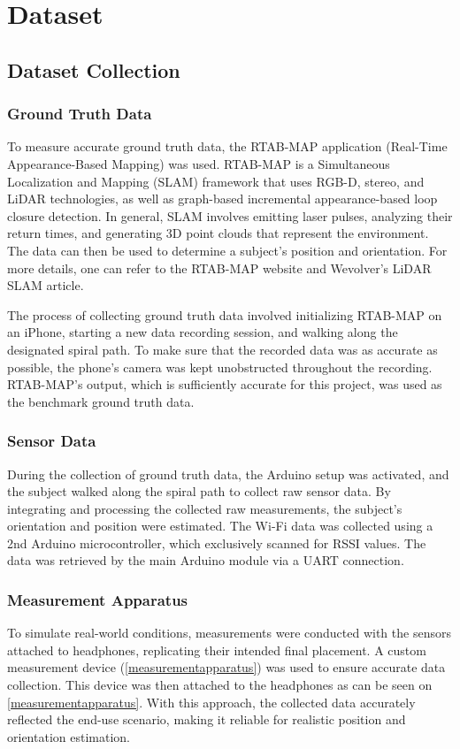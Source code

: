 \chapter{Dataset}
\label{appendix:dataset}
\section{Dataset Collection}

\subsection{Ground Truth Data}
To measure accurate ground truth data, the RTAB-MAP application (Real-Time Appearance-Based Mapping) was used. RTAB-MAP is a Simultaneous Localization and Mapping (SLAM) framework that uses RGB-D, stereo, and LiDAR technologies, as well as graph-based incremental appearance-based loop closure detection. In general, SLAM involves emitting laser pulses, analyzing their return times, and generating 3D point clouds that represent the environment. The data can then be used to determine a subject's position and orientation. For more details, one can refer to the RTAB-MAP website \cite{rtabmap} and Wevolver's LiDAR SLAM article. \cite{malik_2023_lidar}
\par
The process of collecting ground truth data involved initializing RTAB-MAP on an iPhone, starting a new data recording session, and walking along the designated spiral path. To make sure that the recorded data was as accurate as possible, the phone's camera was kept unobstructed throughout the recording. RTAB-MAP's output, which is sufficiently accurate for this project, was used as the benchmark ground truth data.

\subsection{Sensor Data}
During the collection of ground truth data, the Arduino setup was activated, and the subject walked along the spiral path to collect raw sensor data. By integrating and processing the collected raw measurements, the subject's orientation and position were estimated. The Wi-Fi data was collected using a 2nd Arduino microcontroller, which exclusively scanned for RSSI values. The data was retrieved by the main Arduino module via a UART connection.

\subsection{Measurement Apparatus}
To simulate real-world conditions, measurements were conducted with the sensors attached to headphones, replicating their intended final placement. A custom measurement device (\cref{measurementapparatus}) was used to ensure accurate data collection. This device was then attached to the headphones as can be seen on \cref{measurementapparatus}. With this approach, the collected data accurately reflected the end-use scenario, making it reliable for realistic position and orientation estimation.

